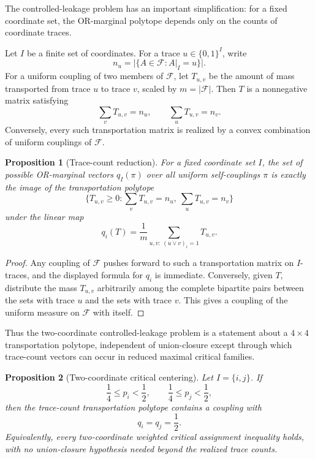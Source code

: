 \documentclass[11pt]{article}
\newtheorem{proposition}{Proposition}
\begin{document}
The controlled-leakage problem has an important simplification: for a fixed
coordinate set, the OR-marginal polytope depends only on the counts of
coordinate traces.

Let $I$ be a finite set of coordinates.  For a trace
$u\in\{0,1\}^{I}$, write
\[
  n_u=|\{A\in\mathcal{F}: A|_I=u\}|.
\]
For a uniform coupling of two members of $\mathcal{F}$, let
$T_{u,v}$ be the amount of mass transported from trace $u$ to trace $v$,
scaled by $m=|\mathcal{F}|$.  Then $T$ is a nonnegative matrix satisfying
\[
  \sum_v T_{u,v}=n_u,
  \qquad
  \sum_u T_{u,v}=n_v.
\]
Conversely, every such transportation matrix is realized by a convex
combination of uniform couplings of $\mathcal{F}$.

\begin{proposition}[Trace-count reduction]
For a fixed coordinate set $I$, the set of possible OR-marginal vectors
$q_I(\pi)$ over all uniform self-couplings $\pi$ is exactly the image of the
transportation polytope
\[
  \{T_{u,v}\geq0:
    \sum_vT_{u,v}=n_u,\ \sum_uT_{u,v}=n_v\}
\]
under the linear map
\[
  q_i(T)
  =
  \frac1m
  \sum_{u,v:\ (u\vee v)_i=1} T_{u,v}.
\]
\end{proposition}

\begin{proof}
Any coupling of $\mathcal{F}$ pushes forward to such a transportation matrix
on $I$-traces, and the displayed formula for $q_i$ is immediate.  Conversely,
given $T$, distribute the mass $T_{u,v}$ arbitrarily among the complete
bipartite pairs between the sets with trace $u$ and the sets with trace $v$.
This gives a coupling of the uniform measure on $\mathcal{F}$ with itself.
\end{proof}

Thus the two-coordinate controlled-leakage problem is a statement about a
$4\times4$ transportation polytope, independent of union-closure except
through which trace-count vectors can occur in reduced maximal critical
families.

\begin{proposition}[Two-coordinate critical centering]
Let $I=\{i,j\}$.  If
\[
  \frac14\leq p_i<\frac12,
  \qquad
  \frac14\leq p_j<\frac12,
\]
then the trace-count transportation polytope contains a coupling with
\[
  q_i=q_j=\frac12.
\]
Equivalently, every two-coordinate weighted critical assignment inequality
holds, with no union-closure hypothesis needed beyond the realized trace
counts.
\end{proposition}
\end{document}

